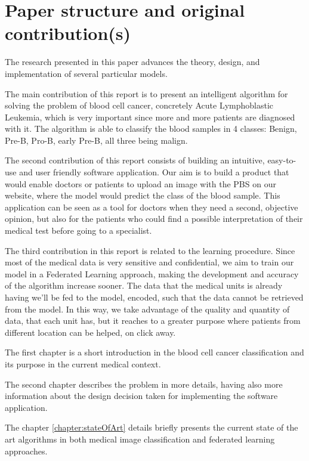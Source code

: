 \documentclass[runningheads,a4paper,11pt]{report}
\begin{document}
\section{Paper structure and original contribution(s)}
\label{section:structure}

The research presented in this paper advances the theory, design, and implementation of several particular models. 

The main contribution of this report is to present an intelligent algorithm for solving the problem of blood cell cancer, concretely Acute Lymphoblastic Leukemia, which is very important since more and more patients are diagnosed with it. The algorithm is able to classify the blood samples in 4 classes: Benign, Pre-B, Pro-B, early Pre-B, all three being malign.

The second contribution of this report consists of building an intuitive, easy-to-use and user friendly software application. Our aim is to build a product that would enable doctors or patients to upload an image with the PBS on our website, where the model would predict the class of the blood sample. This application can be seen as a tool for doctors when they need a second, objective opinion, but also for the patients who could find a possible interpretation of their medical test before going to a specialist.

The third contribution in this report is related to the learning procedure. Since most of the medical data is very sensitive and confidential, we aim to train our model in a Federated Learning approach, making the development and accuracy of the algorithm increase sooner. The data that the medical units is already having we'll be fed to the model, encoded, such that the data cannot be retrieved from the model. In this way, we take advantage of the quality and quantity of data, that each unit has, but it reaches to a greater purpose where patients from different location can be helped, on click away.

The first chapter is a short introduction in the blood cell cancer classification and its purpose in the current medical context.

The second chapter describes the problem in more details, having also more information about the design decision taken for implementing the software application.

The chapter \ref{chapter:stateOfArt} details briefly presents the current state of the art algorithms in both medical image classification and federated learning approaches.
\end{document}
